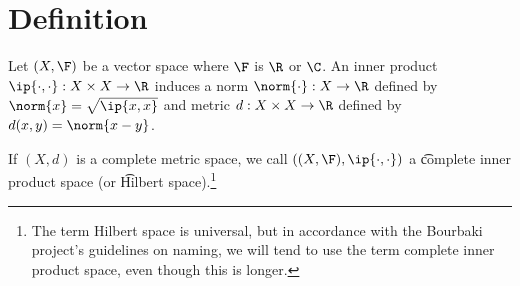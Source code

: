 
\section*{Definition}

Let $(X, \F )$ be a vector space where $\F $ is $\R $ or $\C $.
An inner product $\ip{\cdot ,\cdot }: X \times  X \to \R $ induces a norm $\norm{\cdot }: X \to \R $ defined by $\norm{x} = \sqrt{\ip{x,x}}$ and metric $d: X \times  X \to \R $ defined by $d(x, y) = \norm{x - y}$.

If $(X, d)$ is a complete metric space, we call $((X, \F ), \ip{\cdot ,\cdot })$ a \t{complete inner product space} (or \t{Hilbert space}).\footnote{The term Hilbert space is universal, but in accordance with the Bourbaki project's guidelines on naming, we will tend to use the term complete inner product space, even though this is longer.}

\blankpage